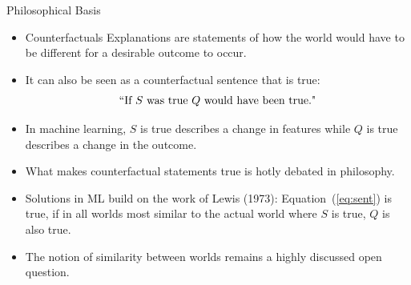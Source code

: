 \documentclass[11pt,compress,t,notes=noshow, xcolor=table]{beamer}
\begin{document}
\begin{vbframe}{Philosophical Basis}
	\begin{itemize}
		\item Counterfactuals Explanations are statements of how the world would have to be different for a desirable outcome to occur. 
		\item It can also be seen as a counterfactual sentence that is true: 
		\begin{equation}
			\textnormal{``If $S$ was true $Q$ would have been true."}
			\label{eq:sent}
		\end{equation}
		\item In machine learning, $S$ is true describes a change in features while $Q$ is true describes a change in the outcome. 
		\item What makes counterfactual statements true is hotly debated in philosophy. 
		\item Solutions in ML build on the work of Lewis (1973): Equation~(\ref{eq:sent}) is true, if in all worlds most similar to the actual world where $S$ is true, $Q$ is also true. 
		\item The notion of similarity between worlds remains a highly discussed open question. 
	\end{itemize}
\end{vbframe}
\end{document}
